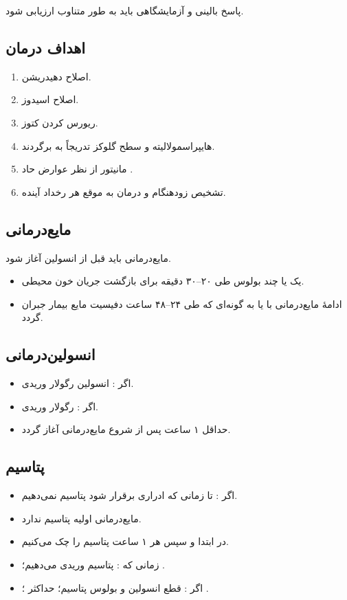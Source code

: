 \documentclass[12pt,a4paper]{article}
\begin{document}
پاسخ بالینی و آزمایشگاهی باید به طور متناوب ارزیابی شود.
\subsection*{اهداف درمان }
\begin{enumerate}
\item اصلاح دهیدریشن.
\item اصلاح اسیدوز.
\item ریورس کردن کتوز.
\item هایپراسمولالیته و سطح گلوکز تدریجاً به  برگردند.
\item مانیتور از نظر عوارض حاد .
\item تشخیص زودهنگام و درمان به موقع هر رخداد آینده.
\end{enumerate}
\subsection*{مایع‌درمانی}
مایع‌درمانی باید قبل از انسولین آغاز شود.
\begin{itemize}
\item یک یا چند بولوس  طی ۲۰–۳۰ دقیقه برای بازگشت جریان خون محیطی.
\item ادامهٔ مایع‌درمانی با  یا  به گونه‌ای که طی ۲۴–۴۸ ساعت دفیسیت مایع بیمار جبران گردد.
\end{itemize}
\subsection*{انسولین‌درمانی}
\begin{itemize}
\item اگر :  انسولین رگولار وریدی.
\item اگر :  رگولار وریدی.
\item حداقل ۱ ساعت پس از شروع مایع‌درمانی آغاز گردد.
\end{itemize}

\subsection*{پتاسیم}
\begin{itemize}
\item اگر : تا زمانی که  ادراری برقرار شود پتاسیم نمی‌دهیم.
\item مایع‌درمانی اولیه پتاسیم ندارد.
\item در ابتدا و سپس هر ۱ ساعت پتاسیم را چک می‌کنیم.
\item زمانی که : پتاسیم وریدی می‌دهیم؛ .
\item اگر : قطع انسولین و بولوس پتاسیم؛ حداکثر ؛ .
\end{itemize}
\end{document}

